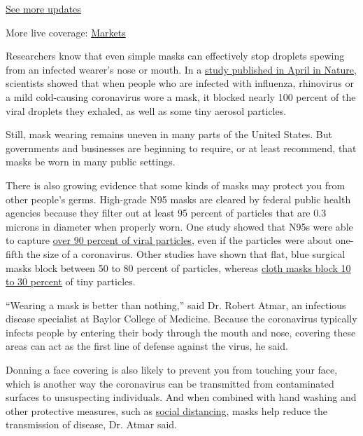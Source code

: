 \href{https://www.nytimes3xbfgragh.onion/2020/09/04/world/covid-19-coronavirus.html?action=click\&pgtype=Article\&state=default\&region=MAIN_CONTENT_1\&context=storylines_live_updates}{See
more updates}

More live coverage:
\href{https://www.nytimes3xbfgragh.onion/live/2020/09/04/business/stock-market-today-coronavirus?action=click\&pgtype=Article\&state=default\&region=MAIN_CONTENT_1\&context=storylines_live_updates}{Markets}

Researchers know that even simple masks can effectively stop droplets
spewing from an infected wearer's nose or mouth. In a
\href{https://www.nature.com/articles/s41591-020-0843-2}{study published
in April in Nature}, scientists showed that when people who are infected
with influenza, rhinovirus or a mild cold-causing coronavirus wore a
mask, it blocked nearly 100 percent of the viral droplets they exhaled,
as well as some tiny aerosol particles.

Still, mask wearing remains uneven in many parts of the United States.
But governments and businesses are beginning to require, or at least
recommend, that masks be worn in many public settings.

There is also growing evidence that some kinds of masks may protect you
from other people's germs. High-grade N95 masks are cleared by federal
public health agencies because they filter out at least 95 percent of
particles that are 0.3 microns in diameter when properly worn. One study
showed that N95s were able to capture
\href{https://www.ajicjournal.org/article/S0196-6553(05)00911-9/fulltext\#articleInformation}{over
90 percent of viral particles}, even if the particles were about
one-fifth the size of a coronavirus. Other studies have shown that flat,
blue surgical masks block between 50 to 80 percent of particles, whereas
\href{https://academic.oup.com/annweh/article/54/7/789/202744}{cloth
masks block 10 to 30 percent} of tiny particles.

``Wearing a mask is better than nothing,'' said Dr. Robert Atmar, an
infectious disease specialist at Baylor College of Medicine. Because the
coronavirus typically infects people by entering their body through the
mouth and nose, covering these areas can act as the first line of
defense against the virus, he said.

Donning a face covering is also likely to prevent you from touching your
face, which is another way the coronavirus can be transmitted from
contaminated surfaces to unsuspecting individuals. And when combined
with hand washing and other protective measures, such as
\href{https://www.nytimes3xbfgragh.onion/2020/04/22/us/politics/social-distancing-coronavirus.html}{social
distancing}, masks help reduce the transmission of disease, Dr. Atmar
said.

